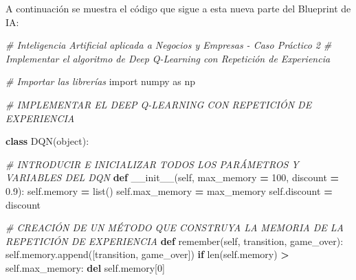 \documentclass[]{book}
\newenvironment{Shaded}{\begin{snugshade}}{\end{snugshade}}
\newcommand{\BuiltInTok}[1]{#1}
\newcommand{\CommentTok}[1]{\textcolor[rgb]{0.56,0.35,0.01}{\textit{#1}}}
\newcommand{\ControlFlowTok}[1]{\textcolor[rgb]{0.13,0.29,0.53}{\textbf{#1}}}
\newcommand{\DecValTok}[1]{\textcolor[rgb]{0.00,0.00,0.81}{#1}}
\newcommand{\FloatTok}[1]{\textcolor[rgb]{0.00,0.00,0.81}{#1}}
\newcommand{\FunctionTok}[1]{\textcolor[rgb]{0.00,0.00,0.00}{#1}}
\newcommand{\ImportTok}[1]{#1}
\newcommand{\KeywordTok}[1]{\textcolor[rgb]{0.13,0.29,0.53}{\textbf{#1}}}
\newcommand{\NormalTok}[1]{#1}
\newcommand{\OperatorTok}[1]{\textcolor[rgb]{0.81,0.36,0.00}{\textbf{#1}}}
\newcommand{\VariableTok}[1]{\textcolor[rgb]{0.00,0.00,0.00}{#1}}
\begin{document}
A continuación se muestra el código que sigue a esta nueva parte del Blueprint de IA:

\begin{Shaded}
\begin{Highlighting}[]
\CommentTok{# Inteligencia Artificial aplicada a Negocios y Empresas - Caso Práctico 2}
\CommentTok{# Implementar el algoritmo de Deep Q-Learning con Repetición de Experiencia}

\CommentTok{# Importar las librerías}
\ImportTok{import}\NormalTok{ numpy }\ImportTok{as}\NormalTok{ np}

\CommentTok{# IMPLEMENTAR EL DEEP Q-LEARNING CON REPETICIÓN DE EXPERIENCIA}

\KeywordTok{class}\NormalTok{ DQN(}\BuiltInTok{object}\NormalTok{):}

    \CommentTok{# INTRODUCIR E INICIALIZAR TODOS LOS PARÁMETROS Y VARIABLES DEL DQN}
    \KeywordTok{def} \FunctionTok{__init__}\NormalTok{(}\VariableTok{self}\NormalTok{, max_memory }\OperatorTok{=} \DecValTok{100}\NormalTok{, discount }\OperatorTok{=} \FloatTok{0.9}\NormalTok{):}
        \VariableTok{self}\NormalTok{.memory }\OperatorTok{=} \BuiltInTok{list}\NormalTok{()}
        \VariableTok{self}\NormalTok{.max_memory }\OperatorTok{=}\NormalTok{ max_memory}
        \VariableTok{self}\NormalTok{.discount }\OperatorTok{=}\NormalTok{ discount}

    \CommentTok{# CREACIÓN DE UN MÉTODO QUE CONSTRUYA LA MEMORIA DE LA REPETICIÓN DE EXPERIENCIA}
    \KeywordTok{def}\NormalTok{ remember(}\VariableTok{self}\NormalTok{, transition, game_over):}
        \VariableTok{self}\NormalTok{.memory.append([transition, game_over])}
        \ControlFlowTok{if} \BuiltInTok{len}\NormalTok{(}\VariableTok{self}\NormalTok{.memory) }\OperatorTok{>} \VariableTok{self}\NormalTok{.max_memory:}
            \KeywordTok{del} \VariableTok{self}\NormalTok{.memory[}\DecValTok{0}\NormalTok{]}


\end{Highlighting}
\end{Shaded}
\end{document}
